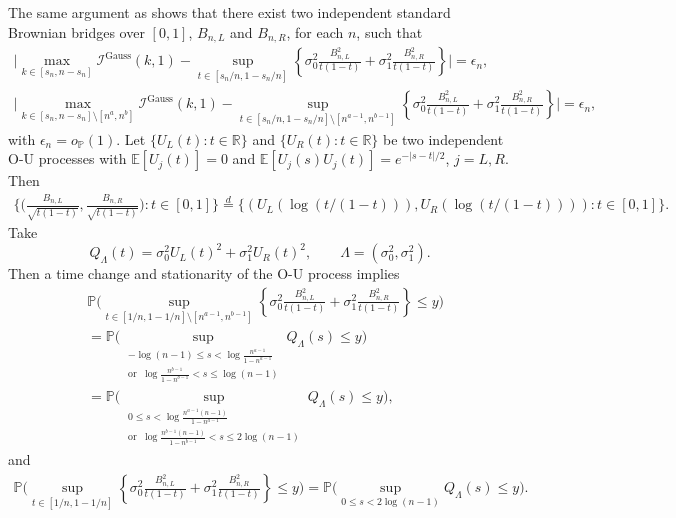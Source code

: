 \documentclass[10pt]{article}
\def\E{\mathbb{E}}
\def\P{\mathbb{P}}
\def\reals{\mathbb{R}}
\def\I{\mathscr{I}}
\theoremstyle{definition}
\theoremstyle{remark}
\begin{document}
The same argument as \cite[(A.4.25) to (A.4.37)]{csorgo1997limit} shows that there exist two independent standard Brownian bridges over $[0,1]$, $B_{n,L}$ and $B_{n,R}$, for each $n$, such that 
\begin{gather*}
    \bigg|\max_{k  \in [s_n, n - s_n]} \I^\text{Gauss}(k,1) - \sup_{t \in [s_n/n, 1 - s_n/n]} \left\{\sigma_0^2\frac{B_{n,L}^2}{t (1 - t)}+\sigma_1^2\frac{B_{n,R}^2}{t (1 - t)}\right\}\bigg| = \epsilon_n, \\
    \bigg|\max_{k  \in [s_n, n - s_n] \setminus [n^a, n^b]} \I^\text{Gauss}(k,1) - \sup_{t \in [s_n/n, 1 - s_n/n] \setminus [n^{a-1}, n^{b-1}]} \left\{\sigma_0^2\frac{B_{n,L}^2}{t (1 - t)}+\sigma_1^2\frac{B_{n,R}^2}{t (1 - t)}\right\}\bigg| = \epsilon_n,
\end{gather*}
with $\epsilon_n=o_{\P}(1)$. Let $\{U_L(t): t \in \reals \}$ and $\{U_R(t): t \in \reals\}$ be two independent O-U processes with $\E[U_j(t)] = 0$ and $\E[U_j(s) U_j(t)] = e^{-|s-t|/2}$, $j = L,R$. Then
\begin{align*}
    \bigg\{\bigg(\frac{B_{n,L}}{\sqrt{t(1 - t)}}, \frac{B_{n,R}}{\sqrt{t (1 - t)}}\bigg): t \in [0,1]\bigg\} \stackrel{d}{=} \{(U_L(\log(t/(1-t))), U_R(\log(t/(1 - t)))): t \in [0,1]\}.
\end{align*}
Take
\[
    Q_\Lambda(t)=\sigma_0^2U_L(t)^2+\sigma_1^2U_R(t)^2,
    \qquad
    \Lambda=(\sigma_0^2,\sigma_1^2).
\]
Then a time change and stationarity of the O-U process implies
\begin{align*}
    & \P \bigg(\sup_{t \in [1/n, 1 - 1/n] \setminus [n^{a-1}, n^{b-1}]} \left\{\sigma_0^2\frac{B_{n,L}^2}{t (1 - t)}+\sigma_1^2\frac{B_{n,R}^2}{t (1 - t)}\right\} \leq y \bigg) \\
    & = \P \bigg(\sup_{\substack{-\log(n - 1) \leq s < \log\frac{n^{a-1}}{1 - n^{a-1}}\\
    \text{or }\ \log\frac{n^{b-1}}{1-n^{b-1}} < s \leq \log(n-1)}} Q_\Lambda(s) \leq y \bigg) \\
    & = \P \bigg(\sup_{\substack{0 \leq s < \log\frac{n^{a-1}(n - 1)}{1 - n^{a-1}}\\
    \text{or }\ \log\frac{n^{b-1}(n-1)}{1-n^{b-1}} < s \leq 2\log(n-1)}} Q_\Lambda(s) \leq y \bigg),
\end{align*}
and
\begin{align*}
    \P \bigg(\sup_{t \in [1/n, 1 - 1/n]} \left\{\sigma_0^2\frac{B_{n,L}^2}{t (1 - t)}+\sigma_1^2\frac{B_{n,R}^2}{t (1 - t)}\right\} \leq y \bigg)
    = \P \bigg(\sup_{0 \leq s < 2\log(n-1)} Q_\Lambda(s) \leq y \bigg).
\end{align*}
\end{document}
